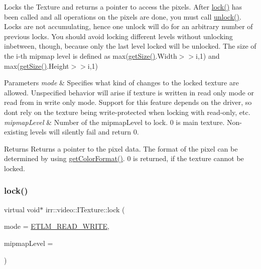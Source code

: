Locks the Texture and returns a pointer to access the pixels. After \hyperlink{classirr_1_1video_1_1ITexture_aa09ee89973a645ebdd2bd61ed859df38}{lock()} has been called and all operations on the pixels are done, you must call \hyperlink{classirr_1_1video_1_1ITexture_a15b9a25aa18528ade37a492bd7b20a10}{unlock()}. Locks are not accumulating, hence one unlock will do for an arbitrary number of previous locks. You should avoid locking different levels without unlocking inbetween, though, because only the last level locked will be unlocked. The size of the i-\/th mipmap level is defined as max(\hyperlink{classirr_1_1video_1_1ITexture_adfcf9558c0f1ae543782c03f7903c48e}{get\+Size()}.Width$>$$>$i,1) and max(\hyperlink{classirr_1_1video_1_1ITexture_adfcf9558c0f1ae543782c03f7903c48e}{get\+Size()}.Height$>$$>$i,1) 
\begin{DoxyParams}{Parameters}
{\em mode} & Specifies what kind of changes to the locked texture are allowed. Unspecified behavior will arise if texture is written in read only mode or read from in write only mode. Support for this feature depends on the driver, so don\textquotesingle{}t rely on the texture being write-\/protected when locking with read-\/only, etc. \\
\hline
{\em mipmap\+Level} & Number of the mipmap\+Level to lock. 0 is main texture. Non-\/existing levels will silently fail and return 0. \\
\hline
\end{DoxyParams}
\begin{DoxyReturn}{Returns}
Returns a pointer to the pixel data. The format of the pixel can be determined by using \hyperlink{classirr_1_1video_1_1ITexture_a48bbc0208c046724fc3264406f774132}{get\+Color\+Format()}. 0 is returned, if the texture cannot be locked. 
\end{DoxyReturn}
\mbox{\label{classirr_1_1video_1_1ITexture_aa09ee89973a645ebdd2bd61ed859df38}} 
\subsubsection{\texorpdfstring{lock()}{lock()}\hspace{0.1cm}{\footnotesize\ttfamily [2/2]}}
{\footnotesize\ttfamily virtual void$\ast$ irr\+::video\+::\+I\+Texture\+::lock (\begin{DoxyParamCaption}\item[{\hyperlink{namespaceirr_1_1video_a3916d259e8fe0d0d02e8ee0adc8af5bc}{E\+\_\+\+T\+E\+X\+T\+U\+R\+E\+\_\+\+L\+O\+C\+K\+\_\+\+M\+O\+DE}}]{mode = {\ttfamily \hyperlink{namespaceirr_1_1video_a3916d259e8fe0d0d02e8ee0adc8af5bcad742bd0e885e6a08c86b8d3d5c601952}{E\+T\+L\+M\+\_\+\+R\+E\+A\+D\+\_\+\+W\+R\+I\+TE}},  }\item[{\hyperlink{namespaceirr_a0416a53257075833e7002efd0a18e804}{u32}}]{mipmap\+Level = {} }\end{DoxyParamCaption})\hspace{0.3cm}{\ttfamily [pure virtual]}}



